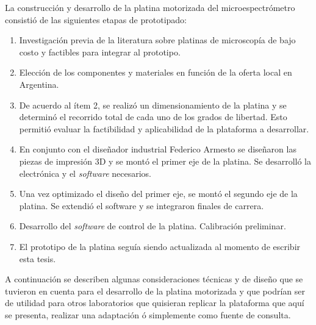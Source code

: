 La construcción y desarrollo de la platina motorizada del microespectrómetro consistió de las siguientes etapas de prototipado:

\begin{enumerate}
\item Investigación previa de la literatura sobre platinas de microscopía de bajo costo y factibles para integrar al prototipo.
\item Elección de los componentes y materiales en función de la oferta local en Argentina.
\item De acuerdo al ítem 2, se realizó un dimensionamiento de la platina y se determinó el recorrido total de cada uno de los grados de libertad. Esto permitió evaluar la factibilidad y aplicabilidad de la plataforma a desarrollar.
\item En conjunto con el diseñador industrial Federico Armesto se diseñaron las piezas de impresión 3D y se montó el primer eje de la platina. Se desarrolló la electrónica y el \textit{software} necesarios.
\item Una vez optimizado el diseño del primer eje, se montó el segundo eje de la platina. Se extendió el software y se integraron finales de carrera.
\item Desarrollo del \textit{software} de control de la platina. Calibración preliminar.
\item El prototipo de la platina seguía siendo actualizada al momento de escribir esta tesis.
\end{enumerate}

A continuación se describen algunas consideraciones técnicas y de diseño que se tuvieron en cuenta para el desarrollo de la platina motorizada y que podrían ser de utilidad para otros laboratorios que quisieran replicar la plataforma que aquí se presenta, realizar una adaptación ó simplemente como fuente de consulta.


